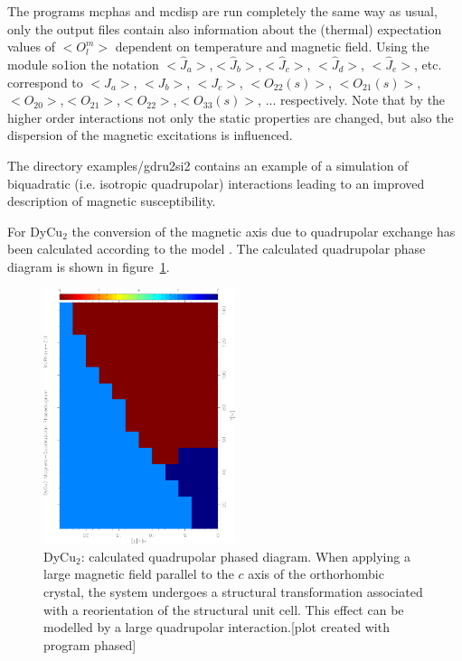The programs {\prg mcphas} and {\prg mcdisp} are run completely the same way as usual, only
the output files contain also information about the (thermal) expectation values of $<O_l^m>$
dependent on temperature and magnetic field. 
Using the module so1ion the notation $<\hat J_a>$,$<\hat J_b>$,$<\hat J_c>$,
$<\hat J_d>$, $<\hat J_e>$, etc. correspond to $<J_a>$, $<J_b>$,
$<J_c>$, $<O_{22}(s)>$, $<O_{21}(s)>$,$<O_{20}>$,$<O_{21}>$,$<O_{22}>$,$<O_{33}(s)>$, ...
 respectively.
Note that by the higher order interactions not only the static properties are changed, but also the
dispersion of the magnetic excitations is influenced.


The directory {\prg examples/gdru2si2} contains an example of a simulation of biquadratic (i.e. isotropic %
quadrupolar) interactions leading to an improved description of magnetic susceptibility.

For DyCu$_2$ the conversion
of the magnetic axis due to quadrupolar exchange has been calculated according to the model 
\cite{yoshida98-1421}. The calculated quadrupolar phase diagram is shown in figure~\ref{qphased}.

\begin{figure}[hb]%
\begin{center}\leavevmode
\includegraphics[angle=-90, width=0.5\textwidth]{figsrc/dyphased.ps}
\end{center}
\caption{DyCu$_2$: calculated quadrupolar phased diagram. When applying a large magnetic field
parallel to the $c$ axis of the orthorhombic crystal, the system undergoes a structural transformation
associated with a reorientation of the structural unit cell. This effect can be modelled by a large
quadrupolar interaction.[plot created with program {\prg phased}]}
\label{qphased}
\end{figure}

